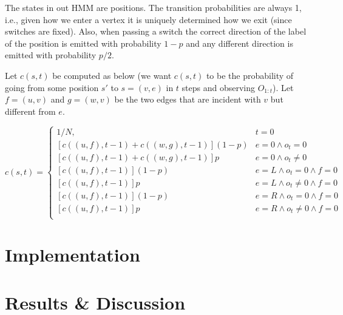 \documentclass[a4paper,11pt]{kth-mag}
\begin{document}
    The states in out HMM are positions. The transition probabilities are
    always 1, i.e., given how we enter a vertex it is uniquely determined how
    we exit (since switches are fixed). Also, when passing a switch the correct
    direction of the label of the position is emitted with probability $1-p$
    and any different direction is emitted with probability $p/2$.

    Let $c(s,t)$ be computed as below (we want $c(s,t)$ to be the probability
    of going from some position $s'$ to $s=(v,e)$ in $t$ steps and observing
    $O_{1:t}$). Let $f=(u,v)$ and $g=(w,v)$ be the two edges that are incident
    with $v$ but different from $e$.

    \begin{equation}
        c(s,t) =
        \begin{cases}
            1/N, & t = 0 \\
            \left[c((u,f),t-1) + c((w,g),t-1)\right](1-p) & e = 0 \wedge o_t = 0 \\
            \left[c((u,f),t-1) + c((w,g),t-1)\right]p     & e = 0 \wedge o_t \neq 0 \\
            \left[c((u,f),t-1)               \right](1-p) & e = L \wedge o_t = 0 \wedge f = 0 \\
            \left[c((u,f),t-1)               \right]p     & e = L \wedge o_t \neq 0 \wedge f = 0 \\
            \left[c((u,f),t-1)               \right](1-p) & e = R \wedge o_t = 0 \wedge f = 0 \\
            \left[c((u,f),t-1)               \right]p     & e = R \wedge o_t \neq 0 \wedge f = 0 \\
        \end{cases}
    \end{equation}

    \chapter{Implementation}
        
    \chapter{Results \& Discussion}
        
\end{document}
